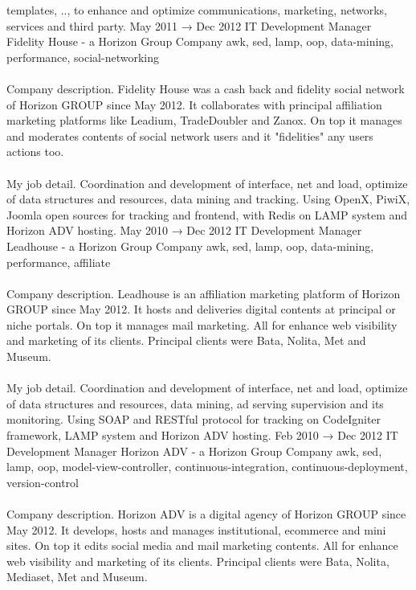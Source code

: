 \documentclass[9pt]{stackoverflow} %
\begin{document}
\begin{tcolorbox}
{\begin{entrylist}
{		templates, .., to enhance and optimize communications, marketing, networks, services and third party.}
	\entry
		{May 2011 → Dec 2012}
		{IT Development Manager}
		{Fidelity House - a Horizon Group Company}
		{{awk, sed, lamp, oop, data-mining, performance, social-networking}\\\\
		Company description. Fidelity House was a cash back and fidelity social network of Horizon GROUP since May 2012. It
		collaborates with principal affiliation marketing platforms like Leadium, TradeDoubler and Zanox. On top it manages and
		moderates contents of social network users and it "fidelities" any users actions too.\\\\
		My job detail. Coordination and development of interface, net and load, optimize of data structures and resources, data mining and tracking.
		Using OpenX, PiwiX, Joomla open sources for tracking and frontend, with Redis on LAMP system and Horizon ADV hosting.}
	\entry
		{May 2010 → Dec 2012}
		{IT Development Manager}
		{Leadhouse - a Horizon Group Company}
		{{awk, sed, lamp, oop, data-mining, performance, affiliate}\\\\
		Company description. Leadhouse is an affiliation marketing platform of Horizon GROUP since May 2012. It hosts and
		deliveries digital contents at principal or niche portals. On top it manages mail marketing. All for enhance web visibility and
		marketing of its clients. Principal clients were Bata, Nolita, Met and Museum.\\\\
		My job detail. Coordination and development of interface, net and load, optimize of data structures and resources, data
		mining, ad serving supervision and its monitoring. Using SOAP and RESTful protocol for tracking on CodeIgniter framework,
		LAMP system and Horizon ADV hosting.}
	\entry
		{Feb 2010 → Dec 2012}
		{IT Development Manager}
		{Horizon ADV - a Horizon Group Company}
		{{awk, sed, lamp, oop, model-view-controller, continuous-integration, continuous-deployment, version-control}\\\\
		Company description. Horizon ADV is a digital agency of Horizon GROUP since May 2012. It develops, hosts and manages
		institutional, ecommerce and mini sites. On top it edits social media and mail marketing contents. All for enhance web
		visibility and marketing of its clients. Principal clients were Bata, Nolita, Mediaset, Met and Museum.\\\\
}
\end{entrylist}}
\end{tcolorbox}
\end{document}
